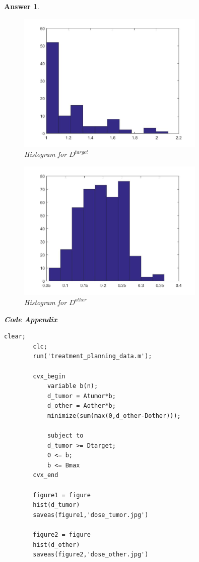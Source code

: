 \documentclass[12pt]{article}
\theoremstyle{colon}
\newtheorem*{answer}{Answer}
\begin{document}
\begin{answer}
\begin{enumerate}[label=\arabic*)]
      \begin{figure}[ht]
        \caption{Histogram for $D^{target}$}
        \centering
          \includegraphics[width=0.8\textwidth]{dose_tumor.jpg}
      \end{figure}

      \begin{figure}[ht]
        \caption{Histogram for $D^{other}$}
        \centering
          \includegraphics[width=0.8\textwidth]{dose_other.jpg}
      \end{figure}

      \clearpage

      \textbf{Code Appendix}

      \begin{lstlisting}[style=Matlab-editor, basicstyle=\scriptsize]
        clear;
        clc;
        run('treatment_planning_data.m');

        cvx_begin
            variable b(n);
            d_tumor = Atumor*b;
            d_other = Aother*b;
            minimize(sum(max(0,d_other-Dother)));

            subject to
            d_tumor >= Dtarget;
            0 <= b;
            b <= Bmax
        cvx_end

        figure1 = figure
        hist(d_tumor)
        saveas(figure1,'dose_tumor.jpg')

        figure2 = figure
        hist(d_other)
        saveas(figure2,'dose_other.jpg')

      \end{lstlisting}
  \end{enumerate}
\end{answer}
\end{document}
